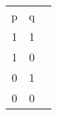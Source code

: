 \documentclass{article}
\begin{document}
\begin{tabular}{|c|c|c|}
\hline
p & q \\
1 & 1 \\
1 & 0 \\
0 & 1 \\
0 & 0 \\
\hline

\end{tabular}
\end{document}
